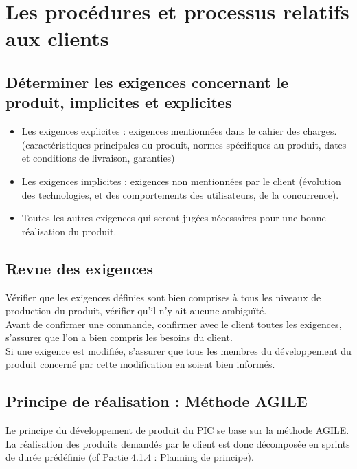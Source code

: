 \section{Les procédures et processus relatifs aux clients}
\label{client}

\subsection{Déterminer les exigences concernant le produit, implicites et explicites}

\begin{itemize}
\item Les exigences explicites : exigences mentionnées dans le cahier des charges. (caractéristiques principales du produit, normes spécifiques au produit, dates et conditions de livraison, garanties)
\item Les exigences implicites : exigences non mentionnées par le client (évolution des technologies, et des comportements des utilisateurs, de la concurrence).
\item Toutes les autres exigences qui seront jugées nécessaires pour une bonne réalisation du produit.
\end{itemize}

\subsection{Revue des exigences}

Vérifier que les exigences définies sont bien comprises à tous les niveaux de production du produit, vérifier qu’il n’y ait aucune ambiguïté. \\
Avant de confirmer une commande, confirmer avec le client toutes les exigences, s’assurer que l’on a bien compris les besoins du client.\\
Si une exigence est modifiée, s’assurer que tous les membres du développement du produit concerné par cette modification en soient bien informés.\\

\subsection{Principe de réalisation : Méthode AGILE}
Le principe du développement de produit du PIC \nomPIC{} se base sur la méthode
AGILE. La réalisation des produits demandés par le client est donc décomposée en sprints de durée prédéfinie (cf Partie 4.1.4 : Planning de principe).


